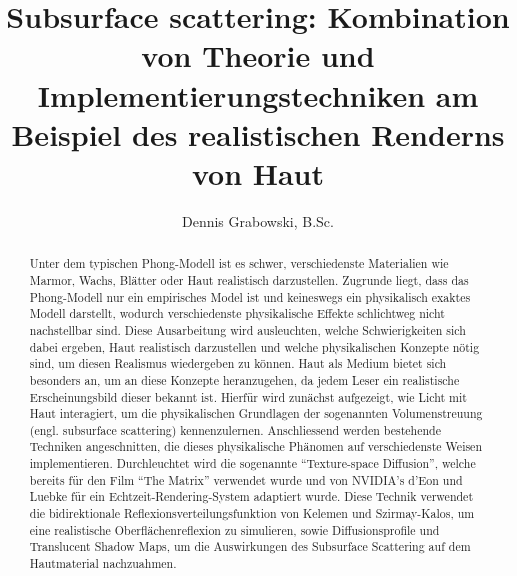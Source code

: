\documentclass[ngerman,runningheads,a4paper]{llncs}[2018/03/10]
\begin{document}
\title{Subsurface scattering: Kombination von Theorie und Implementierungstechniken am Beispiel des realistischen Renderns von Haut}
{}

\author{Dennis Grabowski, B.Sc.}
{}


\maketitle

\begin{abstract}

Unter dem typischen Phong-Modell ist es schwer, verschiedenste Materialien wie Marmor, Wachs, Blätter oder Haut realistisch dar\-zu\-stellen.
Zugrunde liegt, dass das Phong-Modell nur ein empirisches Model ist und keineswegs ein physikalisch exaktes Modell darstellt, wodurch verschiedenste physikalische Effekte schlichtweg nicht nachstellbar sind.
Diese Ausarbeitung wird ausleuchten, welche Schwierigkeiten sich dabei ergeben, Haut realistisch darzustellen und welche physikalischen Konzepte nötig sind, um diesen Realismus wiedergeben zu können.
Haut als Medium bietet sich besonders an, um an diese Konzepte heranzugehen, da jedem Leser ein realistische Erscheinungsbild dieser bekannt ist.
Hierfür wird zunächst aufgezeigt, wie Licht mit Haut interagiert, um die physikalischen Grundlagen der sogenannten Volumenstreuung (engl. subsurface scattering) kennenzulernen.
Anschliessend werden bestehende Techniken angeschnitten, die dieses physikalische Phänomen auf verschiedenste Weisen implementieren.
Durchleuchtet wird die sogenannte \enquote{Texture-space Diffusion}, welche bereits für den Film \enquote{The Matrix} verwendet wurde und von NVIDIA's d'Eon und Luebke für ein Echtzeit-Rendering-System adaptiert wurde.
Diese Technik verwendet die bidirektionale Reflexionsverteilungsfunktion von Kelemen und Szirmay-Kalos, um eine realistische Oberflächenreflexion zu simulieren, sowie Diffusionsprofile und Translucent Shadow Maps, um die Auswirkungen des Subsurface Scattering auf dem Hautmaterial nachzuahmen.

\end{abstract}
\end{document}

